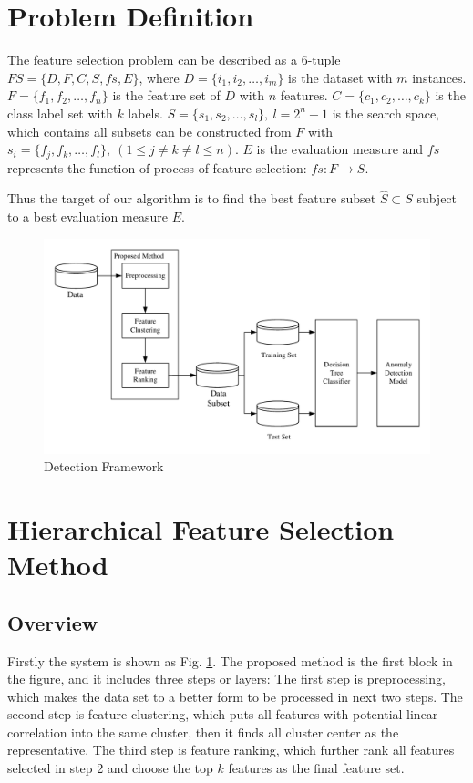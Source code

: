 \documentclass[journal]{IEEEtran}
\begin{document}
\section{Problem Definition}
\label{sec:problem}

The feature selection problem\cite{Maza2018} can be described as a 6-tuple $FS=\{D, F, C, S, fs, E\}$, where $D=\{i_1,i_2,\ldots,i_m\}$ is the dataset with $m$ instances. $F=\{f_1,f_2,\ldots,f_n\}$ is the feature set of $D$ with $n$ features. $C=\{c_1, c_2, \ldots, c_k\}$ is the class label set with $k$ labels. $S=\{s_1, s_2, \ldots, s_l\}, \ l=2^n-1$ is the search space, which contains all subsets can be constructed from $F$ with $s_i=\{f_j, f_k, \ldots, f_l\}, \ (1 \leqslant j \neq k \neq l \leqslant n)$. $E$ is the evaluation measure and $fs$ represents the function of process of feature selection: $fs: F \rightarrow S$.

Thus the target of our algorithm is to find the best feature subset $\hat{S} \subset S$ subject to a best evaluation measure $E$.

\begin{figure}[!htbp]
    \centering
    \includegraphics[scale=0.75]{fig/Framework.pdf}
    \caption{Detection Framework}
    \label{fig:framework}
\end{figure}

\section{Hierarchical Feature Selection Method}
\label{sec:methods}

\subsection{Overview}

Firstly the system is shown as Fig. \ref{fig:framework}. 
The proposed method is the first block in the figure, and it includes three steps or layers: The first step is preprocessing, which makes the data set to a better form to be processed in next two steps. The second step is feature clustering, which puts all features with potential linear correlation into the same cluster, then it finds all cluster center as the representative. The third step is feature ranking, which further rank all features selected in step 2 and choose the top $k$ features as the final feature set. 
\end{document}
